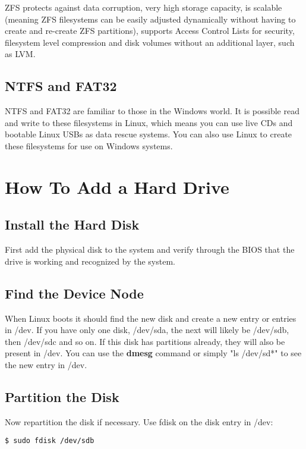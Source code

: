 ZFS protects against data corruption, very high storage capacity, is scalable (meaning ZFS filesystems can be easily adjusted dynamically without having to create and re-create ZFS partitions), supports Access Control Lists for security, filesystem level compression and disk volumes without an additional layer, such as LVM.

\subsection{NTFS and FAT32}

NTFS and FAT32 are familiar to those in the Windows world.  It is possible read and write to these filesystems in Linux, which means you can use live CDs and bootable Linux USBs as data rescue systems.  You can also use Linux to create these filesystems for use on Windows systems.

\section{How To Add a Hard Drive}

\subsection{Install the Hard Disk}

First add the physical disk to the system and verify through the BIOS that the drive is working and recognized by the system.

\subsection{Find the Device Node}

When Linux boots it should find the new disk and create a new entry or entries in /dev.  If you have only one disk, /dev/sda, the next will likely be /dev/sdb, then /dev/sdc and so on.  If this disk has partitions already, they will also be present in /dev.  You can use the \textbf{dmesg} command or simply "ls /dev/sd*" to see the new entry in /dev.

\subsection{Partition the Disk}

Now repartition the disk if necessary.  Use fdisk on the disk entry in /dev:

\begin{verbatim}
$ sudo fdisk /dev/sdb
\end{verbatim}

